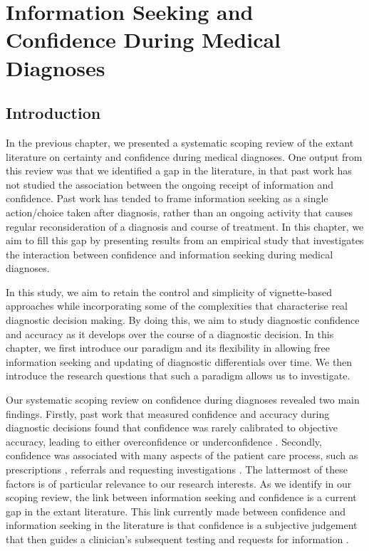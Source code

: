 \documentclass[a4paper, nobind]{templates/ociamthesis}
\begin{document}
\chapter{Information Seeking and Confidence During Medical Diagnoses}\label{chapter-3}

\adjustmtc
{}

\section{Introduction}\label{introduction-1}

In the previous chapter, we presented a systematic scoping review of the extant literature on certainty and confidence during medical diagnoses. One output from this review was that we identified a gap in the literature, in that past work has not studied the association between the ongoing receipt of information and confidence. Past work has tended to frame information seeking as a single action/choice taken after diagnosis, rather than an ongoing activity that causes regular reconsideration of a diagnosis and course of treatment. In this chapter, we aim to fill this gap by presenting results from an empirical study that investigates the interaction between confidence and information seeking during medical diagnoses.

\hfill\break
In this study, we aim to retain the control and simplicity of vignette-based approaches while incorporating some of the complexities that characterise real diagnostic decision making. By doing this, we aim to study diagnostic confidence and accuracy as it develops over the course of a diagnostic decision. In this chapter, we first introduce our paradigm and its flexibility in allowing free information seeking and updating of diagnostic differentials over time. We then introduce the research questions that such a paradigm allows us to investigate.

\hfill\break
Our systematic scoping review on confidence during diagnoses revealed two main findings. Firstly, past work that measured confidence and accuracy during diagnostic decisions found that confidence was rarely calibrated to objective accuracy, leading to either overconfidence \autocite{friedman_physicians_2005,fernandez-aguilar_use_2022,garbayo_metacognitive_2023} or underconfidence \autocite{mann_relationship_1993,yang_effect_2012,brezis_does_2019}. Secondly, confidence was associated with many aspects of the patient care process, such as prescriptions \autocite{levin_antimicrobial_2012,garbayo_metacognitive_2023}, referrals \autocite{calman_variability_1992} and requesting investigations \autocite{tabak_clinical_1996,gupta_associations_2023}. The lattermost of these factors is of particular relevance to our research interests. As we identify in our scoping review, the link between information seeking and confidence is a current gap in the extant literature. This link currently made between confidence and information seeking in the literature is that confidence is a subjective judgement that then guides a clinician's subsequent testing and requests for information \autocite{tabak_clinical_1996,gupta_associations_2023}.\\
\end{document}
